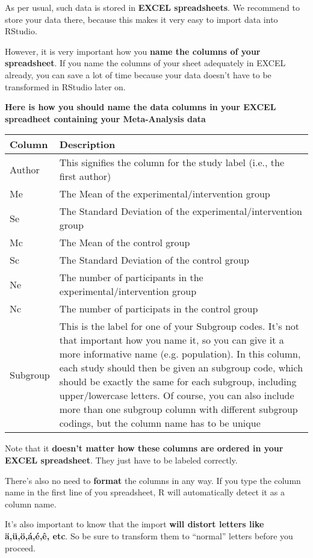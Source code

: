 \documentclass[]{book}
\theoremstyle{definition}
\theoremstyle{definition}
\theoremstyle{definition}
\theoremstyle{remark}
\begin{document}
As per usual, such data is stored in \textbf{EXCEL spreadsheets}. We
recommend to store your data there, because this makes it very easy to
import data into RStudio.

However, it is very important how you \textbf{name the columns of your
spreadsheet}. If you name the columns of your sheet adequately in EXCEL
already, you can save a lot of time because your data doesn't have to be
transformed in RStudio later on.

\textbf{Here is how you should name the data columns in your EXCEL
spreadheet containing your Meta-Analysis data}

\begin{tabular}{l|l}
\hline
Column & Description\\
\hline
Author & This signifies the column for the study label (i.e., the first author)\\
\hline
Me & The Mean of the experimental/intervention group\\
\hline
Se & The Standard Deviation of the experimental/intervention group\\
\hline
Mc & The Mean of the control group\\
\hline
Sc & The Standard Deviation of the control group\\
\hline
Ne & The number of participants in the experimental/intervention group\\
\hline
Nc & The number of participats in the control group\\
\hline
Subgroup & This is the label for one of your Subgroup codes. It's not that important how you name it, so you can give it a more informative name (e.g. population). In this column, each study should then be given an subgroup code, which should be exactly the same for each subgroup, including upper/lowercase letters. Of course, you can also include more than one subgroup column with different subgroup codings, but the column name has to be unique\\
\hline
\end{tabular}

Note that it \textbf{doesn't matter how these columns are ordered in
your EXCEL spreadsheet}. They just have to be labeled correctly.

There's also no need to \textbf{format} the columns in any way. If you
type the column name in the first line of you spreadsheet, R will
automatically detect it as a column name.

\begin{rmdachtung}
It's also important to know that the import \textbf{will distort letters
like ä,ü,ö,á,é,ê, etc}. So be sure to transform them to ``normal''
letters before you proceed.
\end{rmdachtung}
\end{document}
